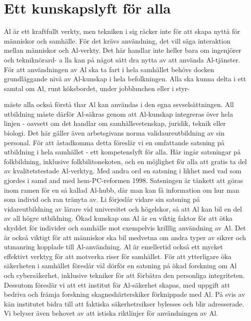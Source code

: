 {\section*{Ett kunskapslyft för alla}
Al är ett kraftfullt verkty, men tekniken i sig räcker inte för att skapa nyttå för människor och samhälle. För det krävs användning, det vill säga interaktion mellan människor och Al-verkty. Det här handlar inte heller bara om ingenjörer och tekniknörard- a lla kan på något sätt dra nytta av att använda Al-tjänster.
För att användningen av Al ska ta fart i hela samhället behövs docken grundläggande nivå av Al-kunskap i hela befolkningen. Alla ska kunna delta i ett samtal om Al, runt köksbordet, under jobblunchen eller i styr-

mäste alla också förstå thar Al kan användas i den egna ssvselsättningen. All utbildning måste därför Al-säkras genom att Al-kunskap integreras över hela linjen - oavsett om det handlar om samhällsvetenskap, juridik, teknik eller biologi. Det här gäller även arbetsgivans norma validaureutbildning av sin personal.
För att åstadkomma detta föreslär vi en omfattande satsning på utbildning i hela samhället - ett kompetenslyft för alla. Här ingår satsningar på folkbildning, inklusive folkbilitonekoten, och en möjlighet för alla att gratis ta del av kvalitetstestade Al-verktyg. Med andra ord en satsning i likhet med vad som gjordes i samd and med hem-PC-reformen 1998. Satsningen är tänkett att göras inom ramen för en så kallad Al-hubb, där man kan få information om hur man som individ och ran tränyta av. Li förjeslår vidare sin satsning på vidareutbildning av lärare vid universitet och högelskor, så att Al kan bil en del av all högre utbildning.
Ökad kunskap om Al är en viktig faktor för att ötka skyddet för individer och samhälle mot exempelvis krilllig användning av Al. Det är också viktigt för att människor ska bil medvetna om andra typer av sikrer och utmanring kopplade till Al-användning. Al är emellertid också ett mycket effektivt verktyg för att motverka riser för samhället. För att ytterligare öka säkerheten i samhället föreslår vål dörför en satsning på ökad forskning om Al och cybersäkerhet, inklusive tekniker för att förbätra den personliga integriteten. Dessutom föreslär vi att ett institut för Al-säkerhet skapas, med uppgift att bedriva och främja forskning skagneshärterskiker förknippade med Al. På svis av kän institutet bidra till att faktiska säkerhetrsikser bylesses och blir adresserade. Vi belyser även behovet av att istiska riktlinjer för användningen av Al.
}
